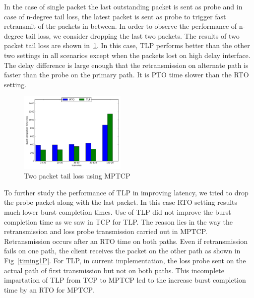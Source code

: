 \documentclass[10pt,draftcls,twocolumn]{IEEEconf}
\begin{document}
In the case of single packet the last outstanding packet is sent as probe and in case of n-degree tail loss,
the latest packet is sent as probe to trigger fast retransmit of the packets in between. In order to observe
the performance of n-degree tail loss, we consider dropping the last two packets. 
The results of two packet tail loss are shown in~\ref{2p}. In this case, TLP performs better than the other 
two settings in all scenarios except when the packets lost on high delay interface. The delay difference is
large enough that the retransmission on alternate path is faster than the probe on the primary path. It 
is PTO time slower than the RTO setting.


\begin{figure}[!ht]
\begin{center}
\includegraphics[angle=0, width=0.46\textwidth,natwidth=578.16,natheight=433.62]{plots/2P.pdf}
\caption{Two packet tail loss using MPTCP}\label{2p}
\end{center}
\end{figure}

To further study the performance of TLP in improving latency, we tried to drop the probe packet along with the last packet. In this case RTO
setting results much lower burst completion times. Use of TLP did not improve the burst completion time as we saw in TCP for TLP. The reason
lies in the way the retransmission and loss probe transmission carried out in MPTCP. Retransmission occurs after an RTO time on both paths.
Even if retransmission fails on one path, the client receives the packet on the other path as shown in Fig~\ref{timing1P}. For TLP, in
current implementation, the loss probe sent on the actual path of first transmission but not on both paths. This incomplete impartation of
TLP from TCP to MPTCP led to the increase burst completion time by an RTO for MPTCP. 
\end{document}
